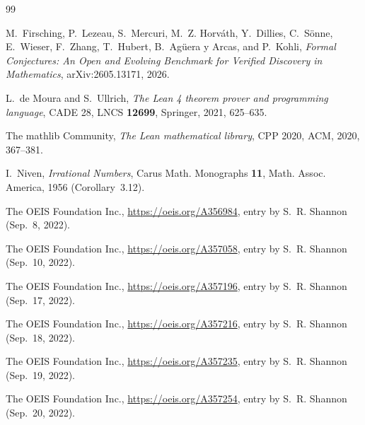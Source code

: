 \documentclass[11pt]{amsart}
\theoremstyle{plain}
\theoremstyle{definition}
\begin{document}
\begin{thebibliography}{99}

M.~Firsching, P.~Lezeau, S.~Mercuri, M.~Z. Horv\'ath, Y.~Dillies, C.~S\"onne, E.~Wieser, F.~Zhang, T.~Hubert, B.~Ag\"uera y Arcas, and P.~Kohli, \emph{Formal Conjectures: An Open and Evolving Benchmark for Verified Discovery in Mathematics}, arXiv:2605.13171, 2026.

L.~de Moura and S.~Ullrich, \emph{The Lean 4 theorem prover and programming language}, CADE 28, LNCS \textbf{12699}, Springer, 2021, 625--635.

The mathlib Community, \emph{The Lean mathematical library}, CPP 2020, ACM, 2020, 367--381.

I.~Niven, \emph{Irrational Numbers}, Carus Math. Monographs \textbf{11}, Math. Assoc. America, 1956 (Corollary~3.12).

The OEIS Foundation Inc., \url{https://oeis.org/A356984}, entry by S.~R. Shannon (Sep.~8, 2022).

The OEIS Foundation Inc., \url{https://oeis.org/A357058}, entry by S.~R. Shannon (Sep.~10, 2022).

The OEIS Foundation Inc., \url{https://oeis.org/A357196}, entry by S.~R. Shannon (Sep.~17, 2022).

The OEIS Foundation Inc., \url{https://oeis.org/A357216}, entry by S.~R. Shannon (Sep.~18, 2022).

The OEIS Foundation Inc., \url{https://oeis.org/A357235}, entry by S.~R. Shannon (Sep.~19, 2022).

The OEIS Foundation Inc., \url{https://oeis.org/A357254}, entry by S.~R. Shannon (Sep.~20, 2022).

\end{thebibliography}
\end{document}
